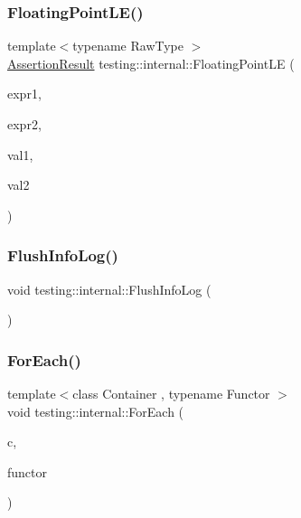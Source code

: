 \mbox{\label{namespacetesting_1_1internal_a17b52b6b1f81f6dcad5cc4d12e5173a6}} 
\subsubsection{\texorpdfstring{Floating\+Point\+L\+E()}{FloatingPointLE()}}
{\footnotesize\ttfamily template$<$typename Raw\+Type $>$ \\
\hyperlink{classtesting_1_1_assertion_result}{Assertion\+Result} testing\+::internal\+::\+Floating\+Point\+LE (\begin{DoxyParamCaption}\item[{const char $\ast$}]{expr1,  }\item[{const char $\ast$}]{expr2,  }\item[{Raw\+Type}]{val1,  }\item[{Raw\+Type}]{val2 }\end{DoxyParamCaption})}

\mbox{\label{namespacetesting_1_1internal_a2135f223bf6b527729aeaa651115183b}} 
\subsubsection{\texorpdfstring{Flush\+Info\+Log()}{FlushInfoLog()}}
{\footnotesize\ttfamily void testing\+::internal\+::\+Flush\+Info\+Log (\begin{DoxyParamCaption}{ }\end{DoxyParamCaption})\hspace{0.3cm}{\ttfamily [inline]}}

\mbox{\label{namespacetesting_1_1internal_a52f5504ed65d116201ccb8f99a44fd7e}} 
\subsubsection{\texorpdfstring{For\+Each()}{ForEach()}}
{\footnotesize\ttfamily template$<$class Container , typename Functor $>$ \\
void testing\+::internal\+::\+For\+Each (\begin{DoxyParamCaption}\item[{const Container \&}]{c,  }\item[{Functor}]{functor }\end{DoxyParamCaption})}

